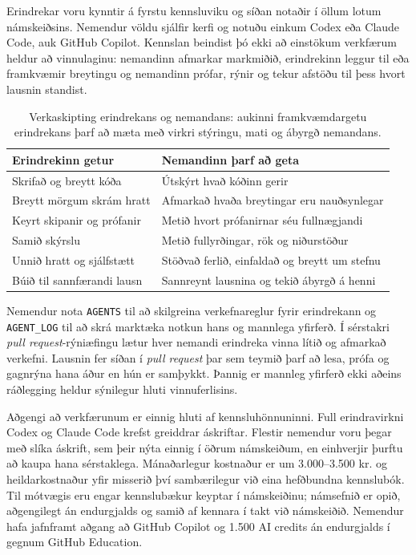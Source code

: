 \documentclass{kennsluakademia_conf}
\begin{document}
Erindrekar voru kynntir á fyrstu kennsluviku og síðan notaðir í öllum
lotum námskeiðsins. Nemendur völdu sjálfir kerfi og notuðu einkum Codex
eða Claude Code, auk GitHub Copilot. Kennslan beindist þó ekki að
einstökum verkfærum heldur að vinnulaginu: nemandinn afmarkar markmiðið,
erindrekinn leggur til eða framkvæmir breytingu og nemandinn prófar,
rýnir og tekur afstöðu til þess hvort lausnin standist.

\begin{table}[t]
\centering
\small
\setlength{\tabcolsep}{8pt}
\renewcommand{\arraystretch}{1.2}
\begin{tabular}{p{}p{}}
\textbf{Erindrekinn getur} & \textbf{Nemandinn þarf að geta} \\
\hline
Skrifað og breytt kóða & Útskýrt hvað kóðinn gerir \\
Breytt mörgum skrám hratt & Afmarkað hvaða breytingar eru nauðsynlegar \\
Keyrt skipanir og prófanir & Metið hvort prófanirnar séu fullnægjandi \\
Samið skýrslu & Metið fullyrðingar, rök og niðurstöður \\
Unnið hratt og sjálfstætt & Stöðvað ferlið, einfaldað og breytt um stefnu \\
Búið til sannfærandi lausn & Sannreynt lausnina og tekið ábyrgð á henni \\
\end{tabular}
\caption{Verkaskipting erindrekans og nemandans: aukinni framkvæmdargetu erindrekans þarf að mæta með virkri stýringu, mati og ábyrgð nemandans.}
\end{table}

Nemendur nota \texttt{AGENTS} til að skilgreina verkefnareglur fyrir
erindrekann og \texttt{AGENT\_LOG} til að skrá marktæka notkun hans og
mannlega yfirferð. Í sérstakri \emph{pull request}-rýniæfingu lætur hver
nemandi erindreka vinna lítið og afmarkað verkefni. Lausnin fer síðan í
\emph{pull request} þar sem teymið þarf að lesa, prófa og gagnrýna hana
áður en hún er samþykkt. Þannig er mannleg yfirferð ekki aðeins
ráðlegging heldur sýnilegur hluti vinnuferlisins.

Aðgengi að verkfærunum er einnig hluti af kennsluhönnuninni. Full
erindravirkni Codex og Claude Code krefst greiddrar áskriftar. Flestir
nemendur voru þegar með slíka áskrift, sem þeir nýta einnig í öðrum
námskeiðum, en einhverjir þurftu að kaupa hana sérstaklega. Mánaðarlegur
kostnaður er um 3.000--3.500 kr. og heildarkostnaður yfir misserið því
sambærilegur við eina hefðbundna kennslubók. Til mótvægis eru engar
kennslubækur keyptar í námskeiðinu; námsefnið er opið, aðgengilegt án
endurgjalds og samið af kennara í takt við námskeiðið. Nemendur hafa
jafnframt aðgang að GitHub Copilot og 1.500 AI credits án endurgjalds í
gegnum GitHub Education.
\end{document}
